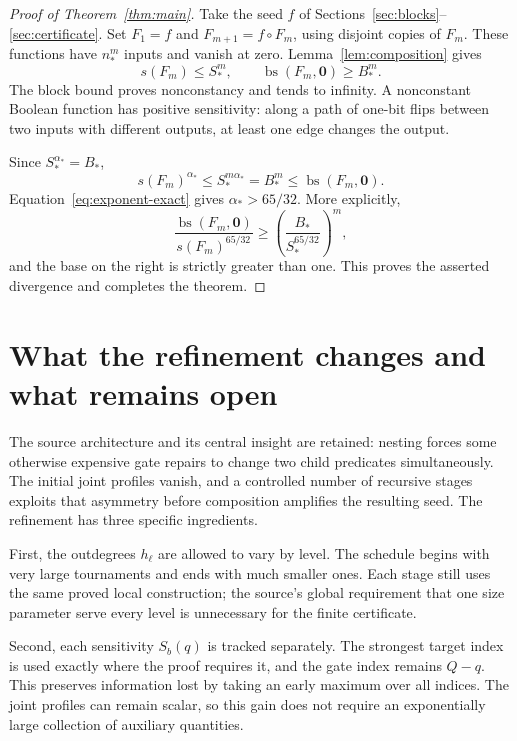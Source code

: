 \documentclass[11pt]{article}
\theoremstyle{definition}
\theoremstyle{remark}
\DeclareMathOperator{\bs}{bs}
\newcommand{\sens}{s}
\newcommand{\zero}{\mathbf{0}}
\begin{document}
\begin{proof}[Proof of Theorem~\ref{thm:main}]
Take the seed $f$ of Sections~\ref{sec:blocks}--\ref{sec:certificate}.
Set $F_1=f$ and $F_{m+1}=f\circ F_m$, using disjoint copies of $F_m$.
These functions have $n_*^m$ inputs and vanish at zero.
Lemma~\ref{lem:composition} gives
\[
                  \sens(F_m)\le S_*^m,\qquad
                  \bs(F_m,\zero)\ge B_*^m.
\]
The block bound proves nonconstancy and tends to infinity.  A
nonconstant Boolean function has positive sensitivity: along a path
of one-bit flips between two inputs with different outputs, at least
one edge changes the output.

Since $S_*^{\alpha_*}=B_*$,
\[
 \sens(F_m)^{\alpha_*}
 \le S_*^{m\alpha_*}=B_*^m\le\bs(F_m,\zero).
\]
Equation~\eqref{eq:exponent-exact} gives $\alpha_*>65/32$.  More
explicitly,
\[
 \frac{\bs(F_m,\zero)}{\sens(F_m)^{65/32}}
 \ge\left(\frac{B_*}{S_*^{65/32}}\right)^m,
\]
and the base on the right is strictly greater than one.  This proves
the asserted divergence and completes the theorem.
\end{proof}

\section{What the refinement changes and what remains open}
\label{sec:research}

The source architecture and its central insight are retained: nesting
forces some otherwise expensive gate repairs to change two child
predicates simultaneously.  The initial joint profiles vanish, and a
controlled number of recursive stages exploits that asymmetry before
composition amplifies the resulting seed.  The refinement has three
specific ingredients.

First, the outdegrees $h_\ell$ are allowed to vary by level.  The
schedule begins with very large tournaments and ends with much smaller
ones.  Each stage still uses the same proved local construction; the
source's global requirement that one size parameter serve every level
is unnecessary for the finite certificate.

Second, each sensitivity $S_b(q)$ is tracked separately.  The strongest
target index is used exactly where the proof requires it, and the gate
index remains $Q-q$.  This preserves information lost by taking an
early maximum over all indices.  The joint profiles can remain scalar,
so this gain does not require an exponentially large collection of
auxiliary quantities.
\end{document}

